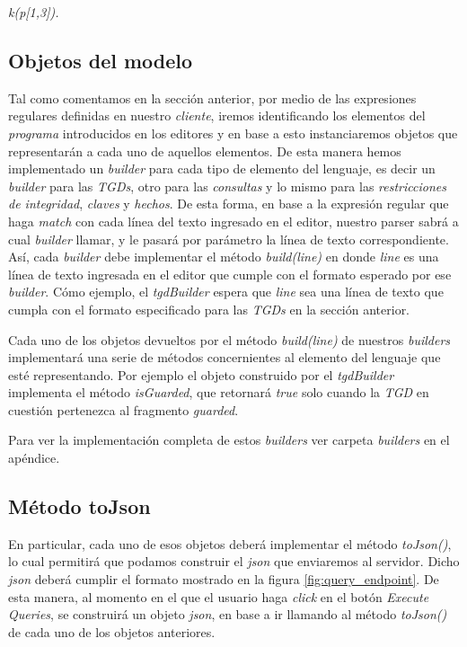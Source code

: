 \documentclass[11pt,a4paper,twoside]{tesis}
\begin{document}
\begin{center}
 \textit{k(p[1,3]).}
\end{center}

\subsection{Objetos del modelo}\label{objetos_javascript}

Tal como comentamos en la sección anterior, por medio de las expresiones regulares definidas en nuestro \textit{cliente}, iremos identificando los elementos del \textit{programa} introducidos en los editores y en base a esto instanciaremos objetos que representarán a cada uno de aquellos elementos. De esta manera hemos implementado un \textit{builder} para cada tipo de elemento del lenguaje, es decir un \textit{builder} para las \textit{TGDs}, otro para las \textit{consultas} y lo mismo para las \textit{restricciones de integridad}, \textit{claves} y \textit{hechos}. De esta forma, en base a la expresión regular que haga \textit{match} con cada línea del texto ingresado en el editor, nuestro parser sabrá a cual \textit{builder} llamar, y le pasará por parámetro la línea de texto correspondiente. Así, cada \textit{builder} debe implementar el método \textit{build(line)} en donde \textit{line} es una línea de texto ingresada en el editor que cumple con el formato esperado por ese \textit{builder}. Cómo ejemplo, el \textit{tgdBuilder} espera que \textit{line} sea una línea de texto que cumpla con el formato especificado para las \textit{TGDs} en la sección anterior.

Cada uno de los objetos devueltos por el método \textit{build(line)} de nuestros \textit{builders} implementará una serie de métodos concernientes al elemento del lenguaje que esté representando. Por ejemplo el objeto construido por el \textit{tgdBuilder} implementa el método \textit{isGuarded}, que retornará \textit{true} solo cuando la \textit{TGD} en cuestión pertenezca al fragmento \textit{guarded}.

Para ver la implementación completa de estos \textit{builders} ver carpeta \textit{builders} en el apéndice.

\subsection{Método toJson}\label{metodo_tojson}

En particular, cada uno de esos objetos deberá implementar el método \textit{toJson()}, lo cual permitirá que podamos construir el \textit{json} que enviaremos al servidor. Dicho \textit{json} deberá cumplir el formato mostrado en la figura \ref{fig:query_endpoint}. De esta manera, al momento en el que el usuario haga \textit{click} en el botón \textit{Execute Queries}, se construirá un objeto \textit{json}, en base a ir llamando al método \textit{toJson()} de cada uno de los objetos anteriores.
\end{document}
